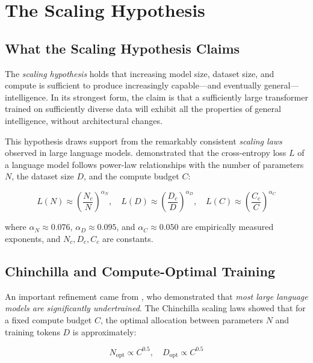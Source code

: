 \section{The Scaling Hypothesis}
\label{sec:scaling-hypothesis}

\subsection{What the Scaling Hypothesis Claims}

The \emph{scaling hypothesis} holds that increasing model size, dataset size, and compute is sufficient to produce increasingly capable---and eventually general---intelligence. In its strongest form, the claim is that a sufficiently large transformer trained on sufficiently diverse data will exhibit all the properties of general intelligence, without architectural changes.

This hypothesis draws support from the remarkably consistent \emph{scaling laws} observed in large language models. \citet{kaplan2020scaling} demonstrated that the cross-entropy loss $L$ of a language model follows power-law relationships with the number of parameters $N$, the dataset size $D$, and the compute budget $C$:

\begin{equation}
L(N) \approx \left(\frac{N_c}{N}\right)^{\alpha_N}, \quad
L(D) \approx \left(\frac{D_c}{D}\right)^{\alpha_D}, \quad
L(C) \approx \left(\frac{C_c}{C}\right)^{\alpha_C}
\label{eq:scaling-laws}
\end{equation}

where $\alpha_N \approx 0.076$, $\alpha_D \approx 0.095$, and $\alpha_C \approx 0.050$ are empirically measured exponents, and $N_c, D_c, C_c$ are constants.

\subsection{Chinchilla and Compute-Optimal Training}

An important refinement came from \citet{hoffmann2022training}, who demonstrated that \emph{most large language models are significantly undertrained}. The Chinchilla scaling laws showed that for a fixed compute budget $C$, the optimal allocation between parameters $N$ and training tokens $D$ is approximately:

\begin{equation}
N_{\text{opt}} \propto C^{0.5}, \quad D_{\text{opt}} \propto C^{0.5}
\label{eq:chinchilla}
\end{equation}

